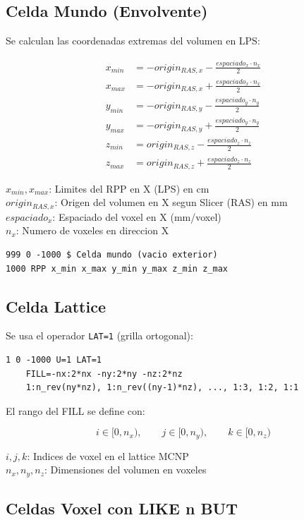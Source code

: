 \documentclass[12pt,a4paper]{article}
\newcommand{\vardef}[2]{\noindent\textbf{#1}: #2\\}
\begin{document}
\subsection{Celda Mundo (Envolvente)}

Se calculan las coordenadas extremas del volumen en LPS:

$$
\begin{aligned}
x_{min} &= -origin_{RAS,x} - \frac{espaciado_x \cdot n_x}{2} \\
x_{max} &= -origin_{RAS,x} + \frac{espaciado_x \cdot n_x}{2} \\
y_{min} &= -origin_{RAS,y} - \frac{espaciado_y \cdot n_y}{2} \\
y_{max} &= -origin_{RAS,y} + \frac{espaciado_y \cdot n_y}{2} \\
z_{min} &= origin_{RAS,z} - \frac{espaciado_z \cdot n_z}{2} \\
z_{max} &= origin_{RAS,z} + \frac{espaciado_z \cdot n_z}{2}
\end{aligned}
$$

\vardef{$x_{min}, x_{max}$}{Limites del RPP en X (LPS) en cm}
\vardef{$origin_{RAS,x}$}{Origen del volumen en X segun Slicer (RAS) en mm}
\vardef{$espaciado_x$}{Espaciado del voxel en X (mm/voxel)}
\vardef{$n_x$}{Numero de voxeles en direccion X}

\begin{verbatim}
999 0 -1000 $ Celda mundo (vacio exterior)
1000 RPP x_min x_max y_min y_max z_min z_max
\end{verbatim}

\subsection{Celda Lattice}

Se usa el operador \texttt{LAT=1} (grilla ortogonal):

\begin{verbatim}
1 0 -1000 U=1 LAT=1
    FILL=-nx:2*nx -ny:2*ny -nz:2*nz
    1:n_rev(ny*nz), 1:n_rev((ny-1)*nz), ..., 1:3, 1:2, 1:1
\end{verbatim}

El rango del FILL se define con:

$$
i \in [0, n_x),\qquad j \in [0, n_y),\qquad k \in [0, n_z)
$$

\vardef{$i, j, k$}{Indices de voxel en el lattice MCNP}
\vardef{$n_x, n_y, n_z$}{Dimensiones del volumen en voxeles}

\subsection{Celdas Voxel con LIKE n BUT}
\end{document}
